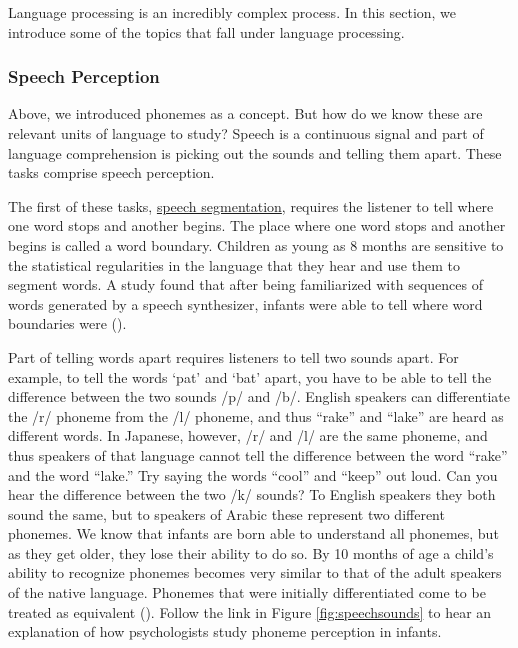 \documentclass[
]{krantz}
\begin{document}
Language processing is an incredibly complex process. In this section, we introduce some of the topics that fall under language processing.

\subsubsection*{Speech Perception}\label{speech-perception}


Above, we introduced phonemes as a concept. But how do we know these are relevant units of language to study? Speech is a continuous signal and part of language comprehension is picking out the sounds and telling them apart. These tasks comprise speech perception.

The first of these tasks, \hyperref[speech-segmentation]{speech segmentation}, requires the listener to tell where one word stops and another begins. The place where one word stops and another begins is called a word boundary. Children as young as 8 months are sensitive to the statistical regularities in the language that they hear and use them to segment words. A study found that after being familiarized with sequences of words generated by a speech synthesizer, infants were able to tell where word boundaries were ().

Part of telling words apart requires listeners to tell two sounds apart. For example, to tell the words `pat' and `bat' apart, you have to be able to tell the difference between the two sounds /p/ and /b/. English speakers can differentiate the /r/ phoneme from the /l/ phoneme, and thus ``rake'' and ``lake'' are heard as different words. In Japanese, however, /r/ and /l/ are the same phoneme, and thus speakers of that language cannot tell the difference between the word ``rake'' and the word ``lake.'' Try saying the words ``cool'' and ``keep'' out loud. Can you hear the difference between the two /k/ sounds? To English speakers they both sound the same, but to speakers of Arabic these represent two different phonemes. We know that infants are born able to understand all phonemes, but as they get older, they lose their ability to do so. By 10 months of age a child's ability to recognize phonemes becomes very similar to that of the adult speakers of the native language. Phonemes that were initially differentiated come to be treated as equivalent (). Follow the link in Figure \ref{fig:speechsounds} to hear an explanation of how psychologists study phoneme perception in infants.
\end{document}
